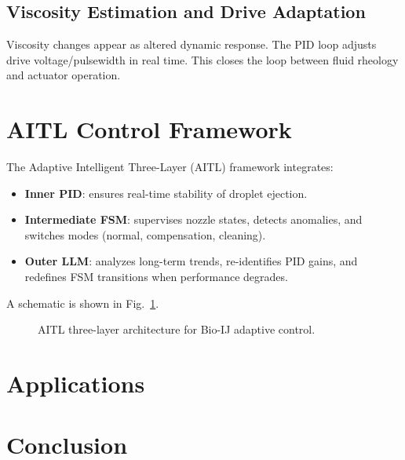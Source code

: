 \documentclass[conference]{IEEEtran}
\begin{document}
\subsection{Viscosity Estimation and Drive Adaptation}
Viscosity changes appear as altered dynamic response.
The PID loop adjusts drive voltage/pulsewidth in real time.
This closes the loop between fluid rheology and actuator operation.

\section{AITL Control Framework}
The Adaptive Intelligent Three-Layer (AITL) framework integrates:
\begin{itemize}
\item \textbf{Inner PID}: ensures real-time stability of droplet ejection.
\item \textbf{Intermediate FSM}: supervises nozzle states, detects anomalies,
and switches modes (normal, compensation, cleaning).
\item \textbf{Outer LLM}: analyzes long-term trends, re-identifies PID gains,
and redefines FSM transitions when performance degrades.
\end{itemize}
A schematic is shown in Fig.~\ref{fig:aitl}.
\begin{figure}[t]
\centering
{}
\caption{AITL three-layer architecture for Bio-IJ adaptive control.}
\label{fig:aitl}
\end{figure}

\section{Applications}


\section{Conclusion}

\end{document}
